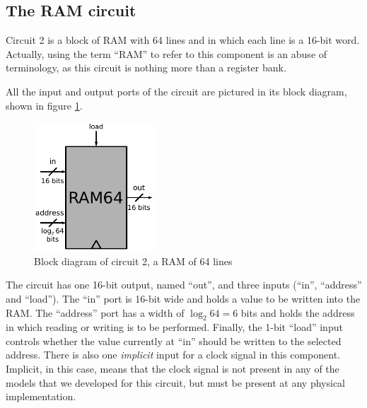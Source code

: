 \documentclass[a4paper]{article}
\begin{document}


        \subsection{The RAM circuit}
        \label{subsec:ram-circuit}
            Circuit 2 is a block of RAM with 64 lines and in which each line is a 16-bit word.
            Actually, using the term ``RAM'' to refer to this component is an abuse of terminology,
            as this circuit is nothing more than a register bank.

            All the input and output ports of the circuit are pictured in its block diagram, shown
            in figure \ref{fig:ram-block}.
            \begin{figure}[h]
                \begin{center}
                    \includegraphics[width=0.4\textwidth]{imgs/ram-block.pdf}
                \end{center}
                \label{fig:ram-block}
                \caption{Block diagram of circuit 2, a RAM of 64 lines}
            \end{figure}

            The circuit has one 16-bit output, named ``out'', and three inputs (``in'', ``address''
            and ``load''). The ``in'' port is 16-bit wide and holds a value to be written into the
            RAM. The ``address'' port has a width of $\log_{2} 64 = 6$ bits and holds the address
            in which reading or writing is to be performed. Finally, the 1-bit ``load'' input
            controls whether the value currently at ``in'' should be written to the selected
            address. There is also one \emph{implicit} input for a clock signal in this component.
            Implicit, in this case, means that the clock signal is not present in any of the models
            that we developed for this circuit, but must be present at any physical implementation.
\end{document}
